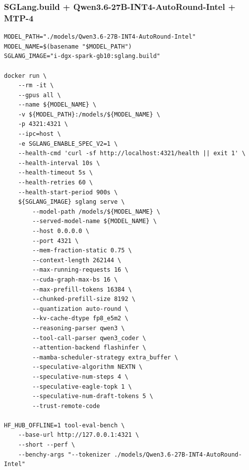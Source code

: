 \documentclass{article}
\begin{document}
\subsubsection{SGLang.build + Qwen3.6-27B-INT4-AutoRound-Intel + MTP-4}
\begin{lstlisting}
MODEL_PATH="./models/Qwen3.6-27B-INT4-AutoRound-Intel"
MODEL_NAME=$(basename "$MODEL_PATH")
SGLANG_IMAGE="i-dgx-spark-gb10:sglang.build"

docker run \
    --rm -it \
    --gpus all \
    --name ${MODEL_NAME} \
    -v ${MODEL_PATH}:/models/${MODEL_NAME} \
    -p 4321:4321 \
    --ipc=host \
    -e SGLANG_ENABLE_SPEC_V2=1 \
    --health-cmd 'curl -sf http://localhost:4321/health || exit 1' \
    --health-interval 10s \
    --health-timeout 5s \
    --health-retries 60 \
    --health-start-period 900s \
    ${SGLANG_IMAGE} sglang serve \
        --model-path /models/${MODEL_NAME} \
        --served-model-name ${MODEL_NAME} \
        --host 0.0.0.0 \
        --port 4321 \
        --mem-fraction-static 0.75 \
        --context-length 262144 \
        --max-running-requests 16 \
        --cuda-graph-max-bs 16 \
        --max-prefill-tokens 16384 \
        --chunked-prefill-size 8192 \
        --quantization auto-round \
        --kv-cache-dtype fp8_e5m2 \
        --reasoning-parser qwen3 \
        --tool-call-parser qwen3_coder \
        --attention-backend flashinfer \
        --mamba-scheduler-strategy extra_buffer \
        --speculative-algorithm NEXTN \
        --speculative-num-steps 4 \
        --speculative-eagle-topk 1 \
        --speculative-num-draft-tokens 5 \
        --trust-remote-code

HF_HUB_OFFLINE=1 tool-eval-bench \
    --base-url http://127.0.0.1:4321 \
    --short --perf \
    --benchy-args "--tokenizer ./models/Qwen3.6-27B-INT4-AutoRound-Intel"
\end{lstlisting}
\end{document}
